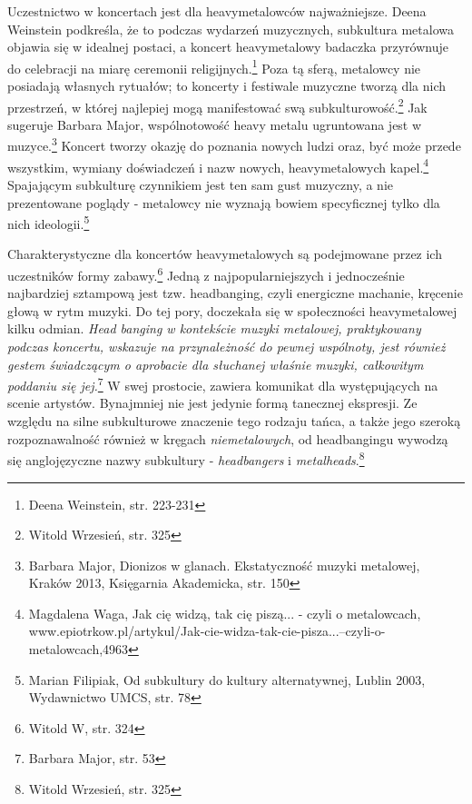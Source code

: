 \documentclass[12pt, a4paper, titlepage]{report}
\begin{document}

Uczestnictwo w koncertach jest dla heavymetalowców najważniejsze. Deena Weinstein podkreśla, że to podczas wydarzeń muzycznych, subkultura metalowa objawia się w idealnej postaci, a koncert heavymetalowy badaczka przyrównuje do celebracji na miarę ceremonii religijnych.\footnote{Deena Weinstein, str. 223-231} Poza tą sferą, metalowcy nie posiadają własnych rytuałów; to koncerty i festiwale muzyczne tworzą dla nich przestrzeń, w której najlepiej mogą manifestować swą subkulturowość.\footnote{Witold Wrzesień, str. 325} Jak sugeruje Barbara Major, wspólnotowość heavy metalu ugruntowana jest w muzyce.\footnote{Barbara Major, Dionizos w glanach. Ekstatyczność muzyki metalowej, Kraków 2013, Księgarnia Akademicka, str. 150} Koncert tworzy okazję do poznania nowych ludzi oraz, być może przede wszystkim, wymiany doświadczeń i nazw nowych, heavymetalowych kapel.\footnote{Magdalena Waga, Jak cię widzą, tak cię piszą... - czyli o metalowcach, www.epiotrkow.pl\break /artykul/Jak-cie-widza-tak-cie-pisza...--czyli-o-metalowcach,4963} Spajającym subkulturę czynnikiem jest ten sam gust muzyczny, a nie prezentowane poglądy - metalowcy nie wyznają bowiem specyficznej tylko dla nich ideologii.\footnote{Marian Filipiak, Od subkultury do kultury alternatywnej, Lublin 2003, Wydawnictwo UMCS, str. 78}

Charakterystyczne dla koncertów heavymetalowych są podejmowane przez ich uczestników formy zabawy.\footnote{Witold W, str. 324} Jedną z najpopularniejszych i jednocześnie najbardziej sztampową jest tzw. headbanging, czyli energiczne machanie, kręcenie głową w rytm muzyki. Do tej pory, doczekała się w społeczności heavymetalowej kilku odmian. \textit{Head banging w kontekście muzyki metalowej, praktykowany podczas koncertu, wskazuje na przynależność do pewnej wspólnoty, jest również gestem świadczącym o aprobacie dla słuchanej właśnie muzyki, całkowitym poddaniu się jej.}\footnote{Barbara Major, str. 53} W swej prostocie, zawiera komunikat dla występujących na scenie artystów. Bynajmniej nie jest jedynie formą tanecznej ekspresji. Ze względu na silne subkulturowe znaczenie tego rodzaju tańca, a także jego szeroką rozpoznawalność również w kręgach \textit{niemetalowych}, od headbangingu wywodzą się anglojęzyczne nazwy subkultury - \textit{headbangers} i \textit{metalheads}.\footnote{Witold Wrzesień, str. 325} 
\end{document}
